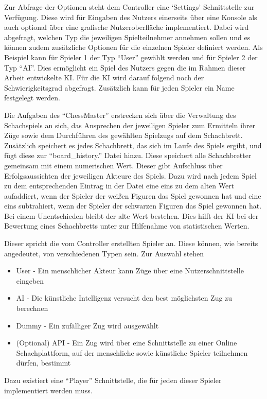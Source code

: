 Zur Abfrage der Optionen steht dem Controller eine `Settings' Schnittstelle zur Verfügung. Diese wird für Eingaben des Nutzers einerseits über eine Konsole als auch optional über eine grafische Nutzeroberfläche implementiert. Dabei wird abgefragt, welchen Typ die jeweiligen Spielteilnehmer annehmen sollen und es können zudem zusätzliche Optionen für die einzelnen Spieler definiert werden. Als Beispiel kann für Spieler 1 der Typ ``User'' gewählt werden und für Spieler 2 der Typ ``AI''. Dies ermöglicht ein Spiel des Nutzers gegen die im Rahmen dieser Arbeit entwickelte KI. Für die KI wird darauf folgend noch der Schwierigkeitsgrad abgefragt. Zusätzlich kann für jeden Spieler ein Name festgelegt werden.

Die Aufgaben des ``ChessMaster'' erstrecken sich über die Verwaltung des Schachspiels an sich, das Ansprechen der jeweiligen Spieler zum Ermitteln ihrer Züge sowie dem Durchführen des gewählten Spielzugs auf dem Schachbrett. Zusätzlich speichert es jedes Schachbrett, das sich im Laufe des Spiels ergibt, und fügt diese zur ``board\_history.'' Datei hinzu. Diese speichert alle Schachbretter gemeinsam mit einem numerischen Wert. Dieser gibt Aufschluss über Erfolgsaussichten der jeweiligen Akteure des Spiels. Dazu wird nach jedem Spiel zu dem entsprechenden Eintrag in der Datei eine eins zu dem alten Wert aufaddiert, wenn der Spieler der weißen Figuren das Spiel gewonnen hat und eine eins subtrahiert, wenn der Spieler der schwarzen Figuren das Spiel gewonnen hat. Bei einem Unentschieden bleibt der alte Wert bestehen. Dies hilft der KI bei der Bewertung eines Schachbretts unter zur Hilfenahme von statistischen Werten. 

Dieser spricht die vom Controller erstellten Spieler an. Diese können, wie bereits angedeutet, von verschiedenen Typen sein. Zur Auswahl stehen
\begin{itemize}
\item User - Ein menschlicher Akteur kann Züge über eine Nutzerschnittstelle eingeben
\item AI - Die künstliche Intelligenz versucht den best möglichsten Zug zu berechnen
\item Dummy - Ein zufälliger Zug wird ausgewählt
\item (Optional) API - Ein Zug wird über eine Schnittstelle zu einer Online Schachplattform, auf der menschliche sowie künstliche Spieler teilnehmen dürfen, bestimmt
\end{itemize}

Dazu existiert eine ``Player'' Schnittstelle, die für jeden dieser Spieler implementiert werden muss.


